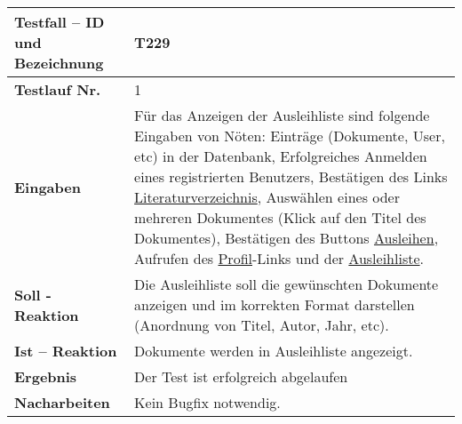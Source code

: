 \begin{longtable}{|p{5cm}|p{10cm}|}
\hline
\textbf{Testfall -- ID und Bezeichnung} & \textnormal{T229} \\
\hline
\textbf{Testlauf Nr.} & \textnormal{1} \\
\hline
\textbf{Eingaben} & \textnormal{Für das Anzeigen der Ausleihliste sind folgende 
Eingaben von Nöten: Einträge (Dokumente, User, etc) in der Datenbank, 
Erfolgreiches Anmelden eines registrierten Benutzers, Bestätigen des Links 
\uline{Literaturverzeichnis}, Auswählen eines oder mehreren Dokumentes 
(Klick auf den Titel des Dokumentes), Bestätigen des Buttons \uline{Ausleihen},   
Aufrufen des \uline{Profil}-Links und der \uline{Ausleihliste}.   
   } \\
\hline
\textbf{Soll - Reaktion} & \textnormal{Die Ausleihliste soll die gewünschten
Dokumente anzeigen und im korrekten Format darstellen (Anordnung von Titel, 
Autor, Jahr, etc). } \\
\hline
\textbf{Ist -- Reaktion} & \textnormal{Dokumente werden in Ausleihliste angezeigt.} \\
\hline
\textbf{Ergebnis} & \textnormal{Der Test ist erfolgreich abgelaufen} \\
\hline
\textbf{Nacharbeiten } & \textnormal{Kein Bugfix notwendig.} \\
\hline
\end{longtable}

